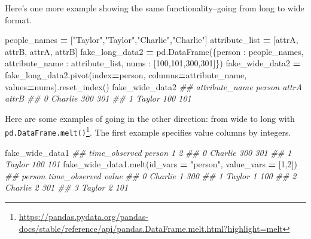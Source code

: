 \documentclass[
  12pt,
  krantz2]{krantz}
\makeatletter
\newenvironment{Shaded}{\begin{snugshade}}{\end{snugshade}}
\newcommand{\CommentTok}[1]{\textcolor[rgb]{0.37,0.37,0.37}{\textit{#1}}}
\newcommand{\DecValTok}[1]{\textcolor[rgb]{0.06,0.06,0.06}{#1}}
\newcommand{\NormalTok}[1]{#1}
\newcommand{\OperatorTok}[1]{\textcolor[rgb]{0.43,0.43,0.43}{\textbf{#1}}}
\newcommand{\StringTok}[1]{\textcolor[rgb]{0.5,0.5,0.5}{#1}}
\renewcommand{\href}[2]{#2\footnote{\url{#1}}}
\newenvironment{kframe}{%
\medskip{}
\setlength{\fboxsep}{.8em}
 \def\at@end@of@kframe{}%
 \ifinner\ifhmode%
  \def\at@end@of@kframe{\end{minipage}}%
  \begin{minipage}{\columnwidth}%
 \fi\fi%
 \def\FrameCommand##1{\hskip\@totalleftmargin \hskip-\fboxsep
 \colorbox{shadecolor}{##1}\hskip-\fboxsep
     \hskip-\linewidth \hskip-\@totalleftmargin \hskip\columnwidth}%
 \MakeFramed {\advance\hsize-\width
   \@totalleftmargin\z@ \linewidth\hsize
   \@setminipage}}%
 {\par\unskip\endMakeFramed%
 \at@end@of@kframe}
\renewenvironment{Shaded}{\begin{kframe}}{\end{kframe}}
\makeatother
\begin{document}
Here's one more example showing the same functionality--going from long to wide format.

\begin{Shaded}
\begin{Highlighting}[]
\NormalTok{people\_names }\OperatorTok{=}\NormalTok{ [}\StringTok{"Taylor"}\NormalTok{,}\StringTok{"Taylor"}\NormalTok{,}\StringTok{"Charlie"}\NormalTok{,}\StringTok{"Charlie"}\NormalTok{]}
\NormalTok{attribute\_list }\OperatorTok{=}\NormalTok{ [}\StringTok{\textquotesingle{}attrA\textquotesingle{}}\NormalTok{, }\StringTok{\textquotesingle{}attrB\textquotesingle{}}\NormalTok{, }\StringTok{\textquotesingle{}attrA\textquotesingle{}}\NormalTok{, }\StringTok{\textquotesingle{}attrB\textquotesingle{}}\NormalTok{]}
\NormalTok{fake\_long\_data2 }\OperatorTok{=}\NormalTok{ pd.DataFrame(\{}\StringTok{\textquotesingle{}person\textquotesingle{}}\NormalTok{ : people\_names, }
                               \StringTok{\textquotesingle{}attribute\_name\textquotesingle{}}\NormalTok{ : attribute\_list,}
                               \StringTok{\textquotesingle{}nums\textquotesingle{}}\NormalTok{ : [}\DecValTok{100}\NormalTok{,}\DecValTok{101}\NormalTok{,}\DecValTok{300}\NormalTok{,}\DecValTok{301}\NormalTok{]\})}
\NormalTok{fake\_wide\_data2 }\OperatorTok{=}\NormalTok{ fake\_long\_data2.pivot(index}\OperatorTok{=}\StringTok{\textquotesingle{}person\textquotesingle{}}\NormalTok{, }
\NormalTok{                                        columns}\OperatorTok{=}\StringTok{\textquotesingle{}attribute\_name\textquotesingle{}}\NormalTok{, }
\NormalTok{                                        values}\OperatorTok{=}\StringTok{\textquotesingle{}nums\textquotesingle{}}\NormalTok{).reset\_index()}
\NormalTok{fake\_wide\_data2}
\CommentTok{\#\# attribute\_name   person  attrA  attrB}
\CommentTok{\#\# 0               Charlie    300    301}
\CommentTok{\#\# 1                Taylor    100    101}
\end{Highlighting}
\end{Shaded}

Here are some examples of going in the other direction: from wide to long with \href{https://pandas.pydata.org/pandas-docs/stable/reference/api/pandas.DataFrame.melt.html?highlight=melt}{\texttt{pd.DataFrame.melt()}}. The first example specifies value columns by integers.

\begin{Shaded}
\begin{Highlighting}[]
\NormalTok{fake\_wide\_data1}
\CommentTok{\#\# time\_observed   person    1    2}
\CommentTok{\#\# 0              Charlie  300  301}
\CommentTok{\#\# 1               Taylor  100  101}
\NormalTok{fake\_wide\_data1.melt(id\_vars }\OperatorTok{=} \StringTok{"person"}\NormalTok{, value\_vars }\OperatorTok{=}\NormalTok{ [}\DecValTok{1}\NormalTok{,}\DecValTok{2}\NormalTok{])}
\CommentTok{\#\#     person time\_observed  value}
\CommentTok{\#\# 0  Charlie             1    300}
\CommentTok{\#\# 1   Taylor             1    100}
\CommentTok{\#\# 2  Charlie             2    301}
\CommentTok{\#\# 3   Taylor             2    101}
\end{Highlighting}
\end{Shaded}
\end{document}
